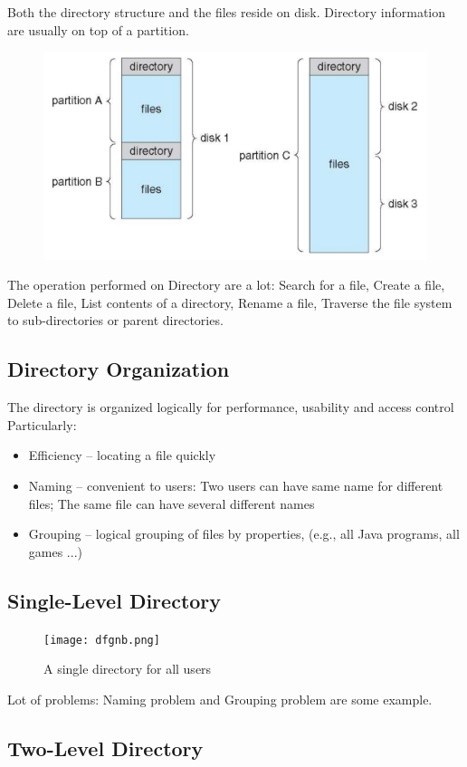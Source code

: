  Both the directory structure and the files reside on disk. Directory information are usually on top of a partition.

 \begin{figure}[h!]
     \centering
     \includegraphics[width=0.5\linewidth]{img/dbgnf.png}
 \end{figure}

 The operation performed on Directory are a lot: Search for a file, Create a file, Delete a file, List contents of a directory, Rename a file, Traverse the file system to sub-directories or parent directories.

 \subsection{Directory Organization}

 The directory is organized logically for performance, usability and access control
Particularly:

\begin{itemize}
    \item Efficiency – locating a file quickly
    \item Naming – convenient to users: Two users can have same name for different files; The same file can have several different names
    \item Grouping – logical grouping of files by properties, (e.g., all Java programs, all games ...)
\end{itemize}

\subsection{Single-Level Directory}

\begin{figure}[h!]
    \centering
    \texttt{[image: dfgnb.png]}
    \caption{A single directory for all users}
\end{figure}

Lot of problems: Naming problem and Grouping problem are some example.

\subsection{Two-Level Directory}

